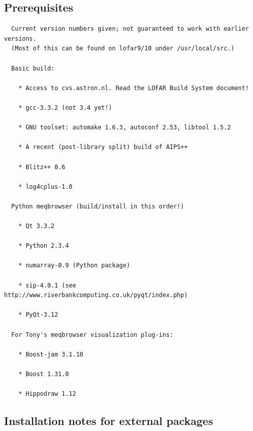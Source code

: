 \documentclass[10pt]{article}
\begin{document}
\subsection{Prerequisites} 
  
\begin{verbatim}
  Current version numbers given; not guaranteed to work with earlier versions.
  (Most of this can be found on lofar9/10 under /usr/local/src.)

  Basic build:

    * Access to cvs.astron.nl. Read the LOFAR Build System document!

    * gcc-3.3.2 (not 3.4 yet!)

    * GNU toolset: automake 1.6.3, autoconf 2.53, libtool 1.5.2

    * A recent (post-library split) build of AIPS++

    * Blitz++ 0.6

    * log4cplus-1.0 

  Python meqbrowser (build/install in this order!)

    * Qt 3.3.2

    * Python 2.3.4

    * numarray-0.9 (Python package)

    * sip-4.0.1 (see http://www.riverbankcomputing.co.uk/pyqt/index.php)

    * PyQt-3.12

  For Tony's meqbrowser visualization plug-ins:

    * Boost-jam 3.1.10

    * Boost 1.31.0

    * Hippodraw 1.12
\end{verbatim}
  
\subsection{Installation notes for external packages}
\end{document}
